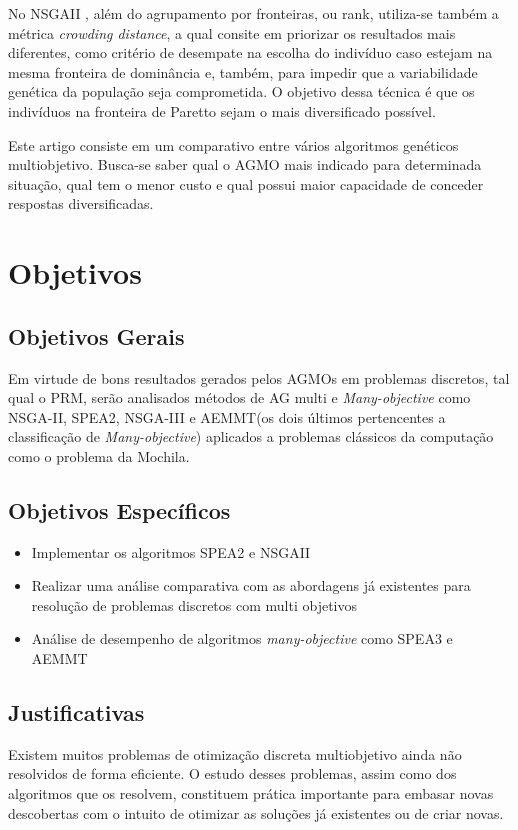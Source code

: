 \documentclass[12pt, %
openright, 
oneside, %
a4paper,    %
brazil]{facom-ufu-abntex2}
\begin{document}
	No NSGAII \cite{NSGAII}, além do agrupamento por fronteiras, ou rank, utiliza-se também a métrica \textit{crowding distance}, a qual consite em priorizar os resultados mais diferentes, como critério de desempate na escolha do indivíduo caso estejam na mesma fronteira de dominância e, também, para impedir que a variabilidade genética da população seja comprometida. O objetivo dessa técnica é que os indivíduos na fronteira de Paretto sejam o mais diversificado possível.
	 
     Este artigo consiste em um comparativo entre vários algoritmos genéticos multiobjetivo. Busca-se saber qual o AGMO mais indicado para determinada situação, qual tem o menor custo e qual possui maior capacidade de conceder respostas diversificadas.


\chapter*[Objetivos]{Objetivos}
\section{Objetivos Gerais}
	Em virtude de bons resultados gerados pelos AGMOs em problemas discretos, tal qual o PRM, serão analisados métodos de AG multi e \textit{Many-objective} como NSGA-II\cite{NSGAII}, SPEA2\cite{SPEA2}, NSGA-III e AEMMT(os dois últimos pertencentes a classificação de \textit{Many-objective}) aplicados a problemas clássicos da computação como o problema da Mochila.

\section{Objetivos Específicos}
\begin{itemize}
		\item Implementar os algoritmos SPEA2\cite{SPEA2} e NSGAII\cite{NSGAII}
		\item Realizar uma análise comparativa com as abordagens já existentes para resolução de problemas discretos com multi objetivos
		\item Análise de desempenho de algoritmos \textit{many-objective} como SPEA3 e AEMMT
	\end{itemize}

\section{Justificativas}
Existem muitos problemas de otimização discreta multiobjetivo ainda não resolvidos de forma eficiente. O estudo desses problemas, assim como dos algoritmos que os resolvem, constituem prática importante para embasar novas descobertas com o intuito de otimizar as soluções já existentes ou de criar novas.
\end{document}
